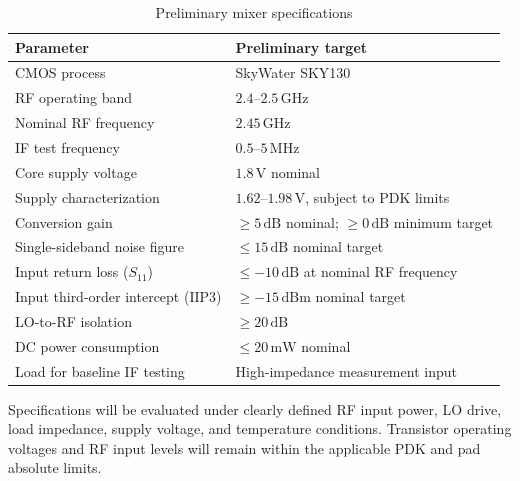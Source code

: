 \documentclass[11pt,letterpaper]{article}
\begin{document}
\begin{table}[htbp]
\centering
\caption{Preliminary mixer specifications}
\label{tab:specifications}
\begin{tabularx}{\textwidth}{@{}p{}Y@{}}
\toprule
\textbf{Parameter} & \textbf{Preliminary target} \\
\midrule

CMOS process &
SkyWater SKY130 \\

RF operating band &
\(2.4\)--\(2.5\,\mathrm{GHz}\) \\

Nominal RF frequency &
\(2.45\,\mathrm{GHz}\) \\

IF test frequency &
\(0.5\)--\(5\,\mathrm{MHz}\) \\

Core supply voltage &
\(1.8\,\mathrm{V}\) nominal \\

Supply characterization &
\(1.62\)--\(1.98\,\mathrm{V}\),
subject to PDK limits \\

Conversion gain &
\(\geq 5\,\mathrm{dB}\) nominal;
\(\geq 0\,\mathrm{dB}\) minimum target \\

Single-sideband noise figure &
\(\leq 15\,\mathrm{dB}\) nominal target \\

Input return loss (\(S_{11}\)) &
\(\leq -10\,\mathrm{dB}\)
at nominal RF frequency \\

Input third-order intercept (\(\mathrm{IIP3}\)) &
\(\geq -15\,\mathrm{dBm}\) nominal target \\

LO-to-RF isolation &
\(\geq 20\,\mathrm{dB}\) \\

DC power consumption &
\(\leq 20\,\mathrm{mW}\) nominal \\

Load for baseline IF testing &
High-impedance measurement input \\

\bottomrule
\end{tabularx}
\end{table}

Specifications will be evaluated under clearly defined
RF input power, LO drive, load impedance, supply voltage,
and temperature conditions. Transistor operating voltages
and RF input levels will remain within the applicable
PDK and pad absolute limits.
\end{document}
